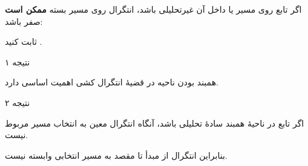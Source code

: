 \begin{EMexample}{}

اگر تابع روی مسیر یا داخل آن غیرتحلیلی باشد، انتگرال روی مسیر بسته \textbf{ممکن است} صفر باشد:

\end{EMexample}

\begin{EMexercise}{}

ثابت کنید .

\end{EMexercise}

\begin{EMremark}{نتیجه ۱}

همبند بودن ناحیه در قضیهٔ انتگرال کشی اهمیت اساسی دارد.

\end{EMremark}

\begin{EMremark}{نتیجه ۲}

اگر تابع  در ناحیهٔ همبند سادهٔ  تحلیلی باشد، آنگاه انتگرال معین به انتخاب مسیر مربوط نیست.

\end{EMremark}


بنابراین انتگرال از مبدأ تا مقصد به مسیر انتخابی وابسته نیست.







\begin{EMimportant}{}


\end{EMimportant}

